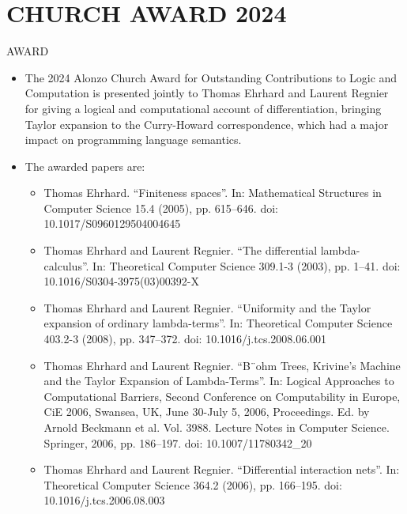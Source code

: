 \documentclass[prodmode,acmtecs]{acmsmall} %
\begin{document}
\section{CHURCH AWARD 2024}\label{CHURCHAWARD2024}AWARD 

\begin{itemize}\item  The 2024 Alonzo Church Award for Outstanding Contributions to Logic and Computation is presented jointly to Thomas Ehrhard and Laurent Regnier for giving a logical and computational account of differentiation, bringing Taylor expansion to the Curry-Howard correspondence, which had a major impact on programming language semantics. 
 
\item  The awarded papers are:  
 
\begin{itemize}\item  Thomas Ehrhard. “Finiteness spaces”. In: Mathematical Structures in Computer Science 15.4 (2005), pp. 615–646. doi: 10.1017/S0960129504004645
\item  Thomas Ehrhard and Laurent Regnier. “The differential lambda-calculus”. In: Theoretical Computer Science 309.1-3 (2003), pp. 1–41. doi: 10.1016/S0304-3975(03)00392-X
\item  Thomas Ehrhard and Laurent Regnier. “Uniformity and the Taylor expansion of ordinary lambda-terms”. In: Theoretical Computer Science 403.2-3 (2008), pp. 347–372. doi: 10.1016/j.tcs.2008.06.001
\item  Thomas Ehrhard and Laurent Regnier. “B¨ohm Trees, Krivine’s Machine and the Taylor Expansion of Lambda-Terms”. In: Logical Approaches to Computational Barriers, Second Conference on Computability in Europe, CiE 2006, Swansea, UK, June 30-July 5, 2006, Proceedings. Ed. by Arnold Beckmann et al. Vol. 3988. Lecture Notes in Computer Science. Springer, 2006, pp. 186–197. doi: 10.1007/11780342\_20 
\item  Thomas Ehrhard and Laurent Regnier. “Differential interaction nets”. In: Theoretical Computer Science 364.2 (2006), pp. 166–195. doi: 10.1016/j.tcs.2006.08.003
\end{itemize} 

\end{itemize}
\end{document}
